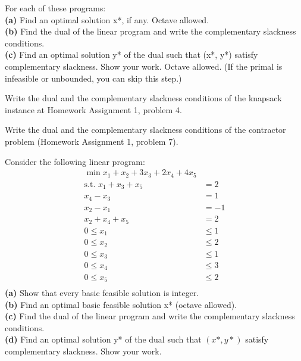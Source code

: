 \documentclass[fleqn]{homework}
\begin{document}
\begin{problem}{2}
\begin{question}
\begin{multicols}{3}
      \end{multicols}
      For each of these programs:\\
      \textbf{(a)} Find an optimal solution x*, if any. Octave allowed.\\
      \textbf{(b)} Find the dual of the linear program and write the
      complementary slackness conditions.\\
      \textbf{(c)} Find an optimal solution y* of the dual such that (x*, y*)
      satisfy complementary slackness. Show your work.  Octave allowed. (If the
      primal is infeasible or unbounded, you can skip this step.)
    \end{question}
  \end{problem}

  \begin{problem}{3}
    \begin{question}
      Write the dual and the complementary slackness conditions of the knapsack
      instance at Homework Assignment 1, problem 4.
    \end{question}
  \end{problem}

  \begin{problem}{4}
    \begin{question}
      Write the dual and the complementary slackness conditions of the
      contractor problem (Homework Assignment 1, problem 7).
    \end{question}
  \end{problem}

  \begin{problem}{5}
    \begin{question}
      Consider the following linear program:
      \begin{align*}
        \min x_1 + x_2 + 3x_3 + 2x_4 + 4x_5 & \\
        \text{s.t. } x_1 + x_3 + x_5 &= 2 \\
        x_4 - x_3 &= 1 \\
        x_2 - x_1 &= -1 \\
        x_2 + x_4 + x_5 &= 2 \\
        0 \le x_1 &\le 1 \\
        0 \le x_2 &\le 2 \\
        0 \le x_3 &\le 1 \\
        0 \le x_4 &\le 3 \\
        0 \le x_5 &\le 2 \\
      \end{align*}
      \textbf{(a)} Show that every basic feasible solution is integer.\\
      \textbf{(b)} Find an optimal basic feasible solution x* (octave allowed).\\
      \textbf{(c)} Find the dual of the linear program and write the
      complementary slackness conditions.\\
      \textbf{(d)} Find an optimal solution y* of the dual such that $(x*, y*)$
      satisfy complementary slackness. Show your work.\\
    \end{question}
  \end{problem}
\end{document}
